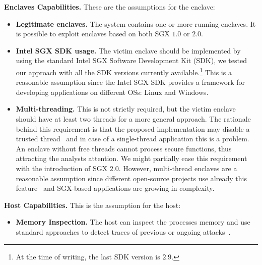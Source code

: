 \textbf{Enclaves Capabilities.}
These are the assumptions for the enclave:

\begin{itemize}
	\item \textbf{Legitimate enclaves.} 
	The system contains one or more running enclaves.
	It is possible to exploit enclaves based on both SGX $1.0$ or $2.0$.
	\item \textbf{Intel SGX SDK usage.} 
	The victim enclave should be implemented by using the standard Intel SGX 
	Software Development Kit (SDK), we tested our approach with all the SDK 
	versions currently available.\footnote{At the time of writing, the last SDK 
		version is $2.9$.}
	This is a reasonable assumption since the Intel SGX SDK provides a 
	framework for developing applications on different OSs: Linux and Windows.
	\item \textbf{Multi-threading.}
	This is not strictly required, but the victim enclave should have
	at least two threads for a more general approach.
	The rationale behind this requirement is that the proposed implementation 
	may disable a trusted thread~\cite{intel-developer-guide} and in case of a 
	single-thread application this is a problem.  
	An enclave without free threads cannot 
	process secure functions, thus attracting the analysts attention.
	We might partially ease this requirement with the introduction of SGX 
	$2.0$. 
	However, multi-thread enclaves are a reasonable assumption since different 
	open-source projects 
	use already this feature~\cite{sqlite-sgx,sgxtor,signal,203255,stealthdb} 
	and SGX-based applications are growing in complexity.
\end{itemize}

\textbf{Host Capabilities.}
This is the assumption for the host:

\begin{itemize}
	\item \textbf{Memory Inspection.}  The host can inspect the 
	processes memory and use standard approaches to detect traces of previous
	or ongoing 
	attacks~\cite{stancill2013check,polychronakis2011rop,kittel2015counteracting,Graziano:2016:RFA:2897845.2897894}.
\end{itemize}

